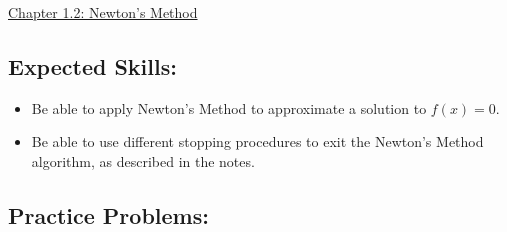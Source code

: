 \documentclass[12pt]{article}
\begin{document}
\begin{center}
\underline{\LARGE{Chapter 1.2: Newton's Method}}
\end{center}

\subsection*{Expected Skills:}

\begin{itemize}

\item Be able to apply Newton's Method to approximate a solution to $f(x)=0$.

\item Be able to use different stopping procedures to exit the Newton's Method algorithm, as described in the notes.

\end{itemize}

\subsection*{Practice Problems: }
\end{document}
